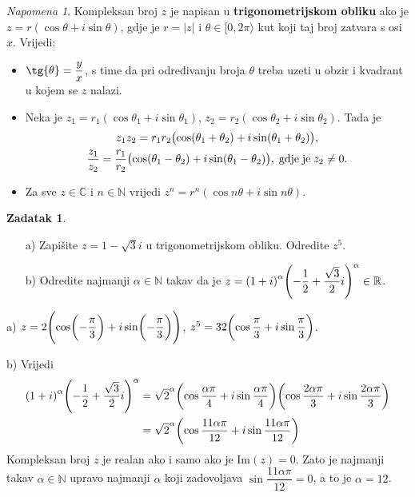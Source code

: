 \documentclass{book}
\let\originalleft\left
\let\originalright\right
\renewcommand{\left}{\mathopen{}\mathclose\bgroup\originalleft}
\renewcommand{\right}{\aftergroup\egroup\originalright}
\renewenvironment{proof}{%
    \vspace{-\parskip}\begin{oldproof}%
    }{%
    \end{oldproof}%
}
\theoremstyle{definition}
\theoremstyle{definition}
\newtheorem{exercise}{Zadatak}
\theoremstyle{remark}
\newtheorem{remark}{Napomena}
\begin{document}
\begin{remark}
Kompleksan broj $z$ je napisan u \textbf{trigonometrijskom obliku} ako je $z=r(\cos{\theta}+i\sin{\theta})$, gdje je $r=|z|$ i $\theta\in [0, 2\pi \rangle$ kut koji taj broj zatvara s osi $x$. Vrijedi:
\begin{itemize}
\item $\tg{\theta}=\dfrac{y}{x}$, s time da pri određivanju broja $\theta$ treba uzeti u obzir i kvadrant u kojem se $z$ nalazi.
\item Neka je $z_1=r_1(\cos{\theta_1}+i\sin{\theta_1})$, $z_2=r_2(\cos{\theta_2}+i\sin{\theta_2})$. Tada je
\begin{gather*}
z_1z_2=r_1r_2\left(\cos(\theta_1+\theta_2)+i\sin(\theta_1+\theta_2)\right),\\
\dfrac{z_1}{z_2}=\dfrac{r_1}{r_2}\left(\cos(\theta_1-\theta_2)+i\sin(\theta_1-\theta_2)\right), \;\mathrm{gdje}\;\mathrm{je}\; z_2\neq 0.
\end{gather*}
\item Za sve $z\in \mathbb{C}$ i $n\in \mathbb{N}$ vrijedi $z^n=r^n(\cos{n\theta}+i\sin{n\theta})$.
\end{itemize}
\end{remark}

\begin{exercise} \textbf{}
\begin{itemize}
\item[a)] Zapišite $z=1-\sqrt{3}i$ u trigonometrijskom obliku. Odredite $z^5$.
\item[b)] Odredite najmanji $\alpha\in \mathbb{N}$ takav da je $z=\left(1+i\right)^{\alpha}\left(-\dfrac{1}{2}+\dfrac{\sqrt{3}}{2}i\right)^{\alpha}\in \mathbb{R}$.
\end{itemize}
\end{exercise}
\begin{proof}[Rješenje]
a) $z=2\left(\cos\left(-\dfrac{\pi}{3}\right)+i\sin\left(-\dfrac{\pi}{3}\right)\right)$, $z^5=32\left(\cos{\dfrac{\pi}{3}}+i\sin{\dfrac{\pi}{3}}\right)$.

b) Vrijedi 
\begin{align*}
\left(1+i\right)^{\alpha}\left(-\dfrac{1}{2}+\dfrac{\sqrt{3}}{2}i\right)^{\alpha}&=\sqrt{2}^{\alpha}\left(\cos{\dfrac{\alpha \pi}{4}}+i\sin{\dfrac{\alpha \pi}{4}}\right)\left(\cos{\dfrac{2\alpha \pi}{3}}+i\sin{\dfrac{2\alpha \pi}{3}}\right)\\
&=\sqrt{2}^{\alpha}\left(\cos{\dfrac{11\alpha \pi}{12}}+i\sin{\dfrac{11\alpha \pi}{12}}\right)
\end{align*}
Kompleksan broj $z$ je realan ako i samo ako je $\mathrm{Im}(z)=0$. Zato je najmanji takav $\alpha\in \mathbb{N}$ upravo najmanji $\alpha$ koji zadovoljava $\sin{\dfrac{11\alpha \pi}{12}}=0$, a to je $\alpha=12$.
\end{proof}
\end{document}
